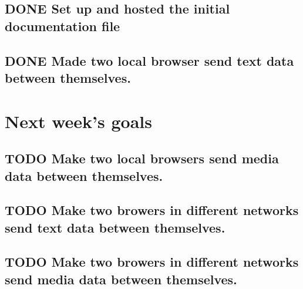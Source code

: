 \documentclass[11pt]{article}
\begin{document}
\subsection*{{\bfseries\sffamily DONE} Set up and hosted the initial documentation file}
\label{sec:org6191f0a}
\subsection*{{\bfseries\sffamily DONE} Made two local browser send text data between themselves.}
\label{sec:org8a43a72}
\section*{Next week's goals}
\label{sec:org708801b}
\subsection*{{\bfseries\sffamily TODO} Make two local browsers send media data between themselves.}
\label{sec:orge0b7e5e}
\subsection*{{\bfseries\sffamily TODO} Make two browers in different networks send text data between themselves.}
\label{sec:orgfe25e75}
\subsection*{{\bfseries\sffamily TODO} Make two browers in different networks send media data between themselves.}
\label{sec:orgbb48761}
\end{document}
